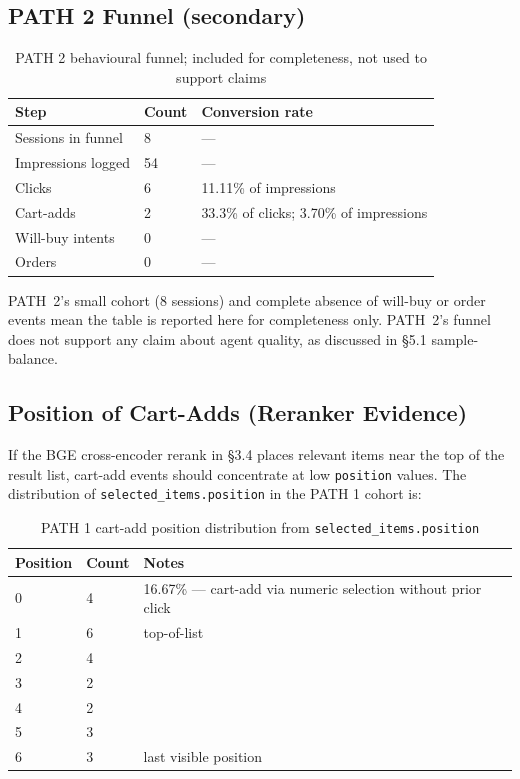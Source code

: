 \subsection{PATH 2 Funnel (secondary)}
\label{subsec:path2_funnel}

\begin{table}[H]
\centering
\begin{tabular}{p{3.5cm}p{2cm}p{4.5cm}}
\toprule
\textbf{Step} & \textbf{Count} & \textbf{Conversion rate}\\
\midrule
Sessions in funnel & 8 & ---\\
Impressions logged & 54 & ---\\
Clicks             & 6 & 11.11\% of impressions\\
Cart-adds          & 2 & 33.3\% of clicks; 3.70\% of impressions\\
Will-buy intents   & 0 & ---\\
Orders             & 0 & ---\\
\bottomrule
\end{tabular}
\caption{PATH 2 behavioural funnel; included for completeness, not used to support claims}
\label{tab:path2_funnel}
\end{table}

PATH~2's small cohort (8 sessions) and complete absence of will-buy or order events mean the table is reported here for completeness only. PATH~2's funnel does not support any claim about agent quality, as discussed in §5.1 sample-balance.

\subsection{Position of Cart-Adds (Reranker Evidence)}
\label{subsec:position_histogram}

If the BGE cross-encoder rerank in §3.4 places relevant items near the top of the result list, cart-add events should concentrate at low \texttt{position} values. The distribution of \texttt{selected\_items.position} in the PATH 1 cohort is:

\begin{table}[H]
\centering
\begin{tabular}{p{2cm}p{2cm}p{8cm}}
\toprule
\textbf{Position} & \textbf{Count} & \textbf{Notes}\\
\midrule
0 & 4  & 16.67\% --- cart-add via numeric selection without prior click\\
1 & 6  & top-of-list\\
2 & 4 & \\
3 & 2 & \\
4 & 2 & \\
5 & 3 & \\
6 & 3 & last visible position\\
\bottomrule
\end{tabular}
\caption{PATH 1 cart-add position distribution from \texttt{selected\_items.position}}
\label{tab:position_histogram}
\end{table}

